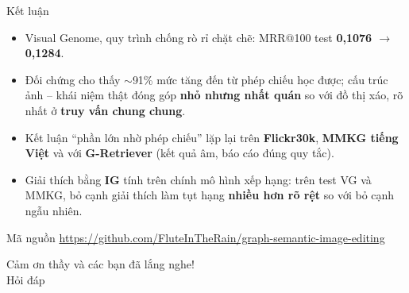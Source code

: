\documentclass[10pt, aspectratio=169]{beamer}
\makeatletter
\newcommand{\mrr}{MRR@100}
\makeatother
\begin{document}
\begin{frame}{Kết luận}
  \begin{itemize}
    \item Visual Genome, quy trình chống rò rỉ chặt chẽ: \mrr{} test \textbf{0,1076 $\to$ 0,1284}.
    \item Đối chứng cho thấy $\sim$91\% mức tăng đến từ phép chiếu học được; cấu trúc ảnh -- khái niệm thật đóng góp \textbf{nhỏ nhưng nhất quán} so với đồ thị xáo, rõ nhất ở \textbf{truy vấn chung chung}.
    \item Kết luận ``phần lớn nhờ phép chiếu'' lặp lại trên \textbf{Flickr30k}, \textbf{MMKG tiếng Việt} và với \textbf{G-Retriever} (kết quả âm, báo cáo đúng quy tắc).
    \item Giải thích bằng \textbf{IG} tính trên chính mô hình xếp hạng: trên test VG và MMKG, bỏ cạnh giải thích làm tụt hạng \textbf{nhiều hơn rõ rệt} so với bỏ cạnh ngẫu nhiên.
  \end{itemize}
  \vfill
  \begin{block}{Mã nguồn}
    \url{https://github.com/FluteInTheRain/graph-semantic-image-editing}
  \end{block}
\end{frame}

\begin{frame}
  \centering\vspace{1cm}
  {\Huge\color{xanh} Cảm ơn thầy và các bạn đã lắng nghe!}\\[1cm]
  {\Large Hỏi đáp}
\end{frame}
\end{document}
